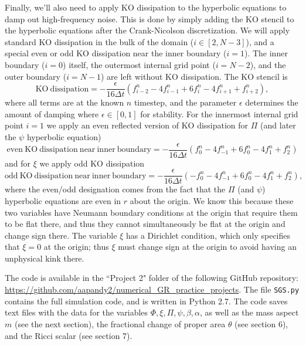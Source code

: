 \documentclass[12pt]{article}
\numberwithin{equation}{section}
\begin{document}
Finally, we'll also need to apply KO dissipation to the hyperbolic equations to damp out high-frequency noise.  This is done by simply adding the KO stencil to the hyperbolic equations after the Crank-Nicolson discretization.  We will apply standard KO dissipation in the bulk of the domain ($i \in [2, N-3]$), and a special even or odd KO dissipation near the inner boundary ($i = 1$).  The inner boundary ($i=0$) itself, the outermost internal grid point ($i = N-2$), and the outer boundary ($i = N-1$) are left without KO dissipation.  The KO stencil is
\begin{equation}
\mathrm{KO~dissipation} = -\frac{\epsilon}{16 \Delta t} (f^{n}_{i-2} - 4 f^{n}_{i-1} + 6 f^{n}_{i} - 4 f^{n}_{i+1} + f^{n}_{i+2}),
\end{equation}
where all terms are at the known $n$ timestep, and the parameter $\epsilon$ determines the amount of damping where $\epsilon \in [0, 1]$ for stability.  For the innermost internal grid point $i = 1$ we apply an even reflected version of KO dissipation for $\Pi$ (and later the $\psi$ hyperbolic equation)
\begin{equation}
\mathrm{even~KO~dissipation~near~inner~boundary} = -\frac{\epsilon}{16 \Delta t} (f^{n}_{0} - 4 f^{n}_{-1} + 6 f^{n}_{0} - 4 f^{n}_{1} + f^{n}_{2})
\end{equation}
and for $\xi$ we apply odd KO dissipation
\begin{equation}
\mathrm{odd~KO~dissipation~near~inner~boundary} = -\frac{\epsilon}{16 \Delta t} (-f^{n}_{0} - 4 f^{n}_{-1} + 6 f^{n}_{0} - 4 f^{n}_{1} + f^{n}_{2}),
\end{equation}
where the even/odd designation comes from the fact that the $\Pi$ (and $\psi$) hyperbolic equations are even in $r$ about the origin.  We know this because these two variables have Neumann boundary conditions at the origin that require them to be flat there, and thus they cannot simultaneously be flat at the origin and change sign there.  The variable $\xi$ has a Dirichlet condition, which only specifies that $\xi = 0$ at the origin; thus $\xi$ must change sign at the origin to avoid having an unphysical kink there.

The code is available in the ``Project 2" folder of the following GitHub repository: \url{https://github.com/aapandy2/numerical_GR_practice_projects}.  The file {\tt SGS.py} contains the full simulation code, and is written in Python 2.7.  The code saves text files with the data for the variables $\Phi, \xi, \Pi, \psi, \beta, \alpha$, as well as the mass aspect $m$ (see the next section), the fractional change of proper area $\theta$ (see section 6), and the Ricci scalar (see section 7). 
\end{document}

